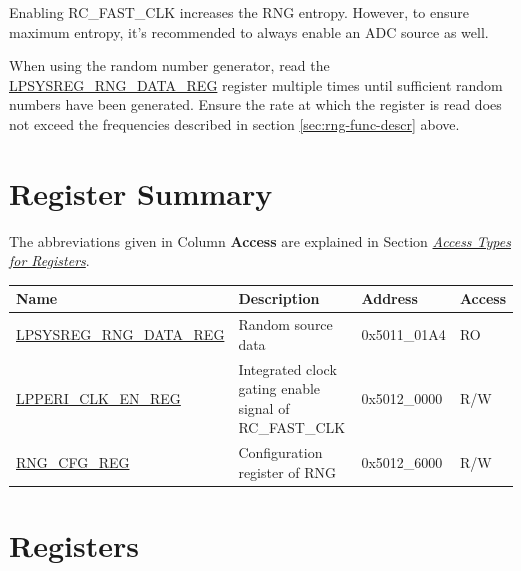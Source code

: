 \documentclass[main\_\_EN.tex]{subfiles}
\begin{document}
\begin{tiplisting}\label{others:rng-note-clock-seed}
     Enabling RC\_FAST\_CLK increases the RNG entropy. However, to ensure maximum entropy, it's recommended to always enable an ADC source as well.
\end{tiplisting}

When using the random number generator, read the \hyperref[regdesc:LPSYSREGRNGDATAREG]{LPSYSREG\_RNG\_DATA\_REG} register multiple times until sufficient random numbers have been generated. Ensure the rate at which the register is read does not exceed the frequencies described in section \ref{sec:rng-func-descr} above.



\newpage
\hypertarget{rng-reg-summ}{}
\section{Register Summary}
\label{sec:rng-reg-summ}




The abbreviations given in Column \textbf{Access} are explained in Section \hyperref[glossary-access-types]{\textit{Access Types for Registers}}.

\begin{table}[H]
    \centering
    \setlength{\extrarowheight}{0.3em}
        \begin{tabular}{ | l | l | l | l | }
    \hline
    \rowcolor{lightgray}
    \textbf{Name} & \textbf{Description} & \textbf{Address} & \textbf{Access} \\ \hline
    \hyperref[regdesc:LPSYSREGRNGDATAREG]{LPSYSREG\_RNG\_DATA\_REG} & Random source data & 0x5011\_01A4 & RO \\ \hline
    \hyperref[regdesc:LPPERICLKENREG]{LPPERI\_CLK\_EN\_REG} & Integrated clock gating enable signal of RC\_FAST\_CLK & 0x5012\_0000 & R/W \\ \hline
    \hyperref[regdesc:RNGCFGREG]{RNG\_CFG\_REG} & Configuration register of RNG & 0x5012\_6000 & R/W \\ \hline
    \end{tabular}
\end{table}




\newpage
\section{Registers}
\end{document}
